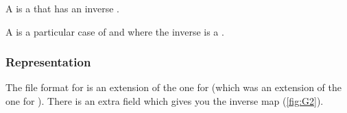 
A \Group is a \Monoid that has an inverse \Mapping.


A \FiniteGroup is a particular case of \Group and \FiniteMonoid where the inverse is a \FiniteMap.


\subsubsection*{Representation}

\begin{marginfigure}%
    \caption{Simple group $\makeset{\minusone,\plusone}$ with multiplication}%
    \label{fig:G2}%
\end{marginfigure}%

The file format for  is an extension of the one for  (which was an extension of the one for ).
There is an extra field  which gives you the inverse map (\cref{fig:G2}).


